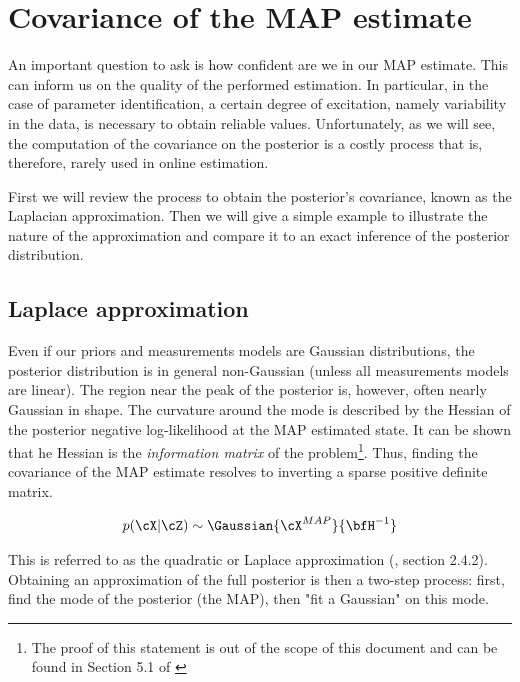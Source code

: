 \appendix




\chapter{Covariance of the MAP estimate}
\label{chp:MAP_covariance}
An important question to ask is how confident are we in our MAP estimate.
This can inform us on the quality of the performed estimation. In particular, in the case of parameter identification, a certain degree of excitation,
namely variability in the data, is necessary to obtain reliable values. Unfortunately, as we will see, the computation of the covariance on the posterior
is a costly process that is, therefore, rarely used in online estimation.

First we will review the process to obtain the posterior's covariance, known as the Laplacian approximation. Then we will give a simple example to
illustrate the nature of the approximation and compare it to an exact inference of the posterior distribution.

\section{Laplace approximation}
\label{sec:map_covariance}
Even if our priors and measurements models are Gaussian distributions, the posterior distribution
is in general non-Gaussian (unless all measurements models are linear). The region near the peak of the posterior is, however, often nearly Gaussian in shape.
The curvature around the mode is described by the Hessian of the posterior negative log-likelihood at the MAP estimated state. 
It can be shown that he Hessian is the \textit{information matrix} of the problem\footnote{The proof of this statement is out of the scope of this document and can be found in Section 5.1 of
\cite{peng2018advanced}}. Thus, finding the covariance of the MAP estimate resolves to inverting a 
sparse positive definite matrix.

\begin{equation}
    p(\cX | \cZ) \sim \Gaussian{\cX^{MAP}}{\bfH^{-1}}
    \label{eq:map_laplace}
\end{equation}

This is referred to as the quadratic or Laplace approximation (\cite{mcelreath2018statistical}, section 2.4.2). Obtaining an approximation of the full posterior is then a two-step process: 
first, find the mode of the posterior (the MAP), then "fit a Gaussian" on this mode. 

